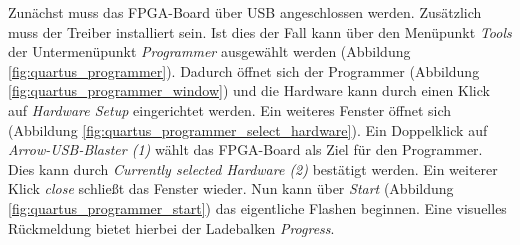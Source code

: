     Zunächst muss das FPGA-Board über USB angeschlossen werden. Zusätzlich muss der Treiber installiert sein.
    Ist dies der Fall kann über den Menüpunkt \textit{Tools} der Untermenüpunkt \textit{Programmer}
    ausgewählt werden (Abbildung \ref{fig:quartus_programmer}).
    Dadurch öffnet sich der Programmer (Abbildung \ref{fig:quartus_programmer_window})
    und die Hardware kann durch einen Klick auf \textit{Hardware Setup} eingerichtet werden.
    Ein weiteres Fenster öffnet sich (Abbildung \ref{fig:quartus_programmer_select_hardware}).
    Ein Doppelklick auf \textit{Arrow-USB-Blaster (1)} wählt das FPGA-Board als Ziel für den Programmer.
    Dies kann durch \textit{Currently selected Hardware (2)} bestätigt werden. Ein weiterer Klick 
    \textit{close} schließt das Fenster wieder. Nun kann über \textit{Start}
    (Abbildung \ref{fig:quartus_programmer_start}) das eigentliche Flashen beginnen.
    Eine visuelles Rückmeldung bietet hierbei der Ladebalken \textit{Progress}.
    

